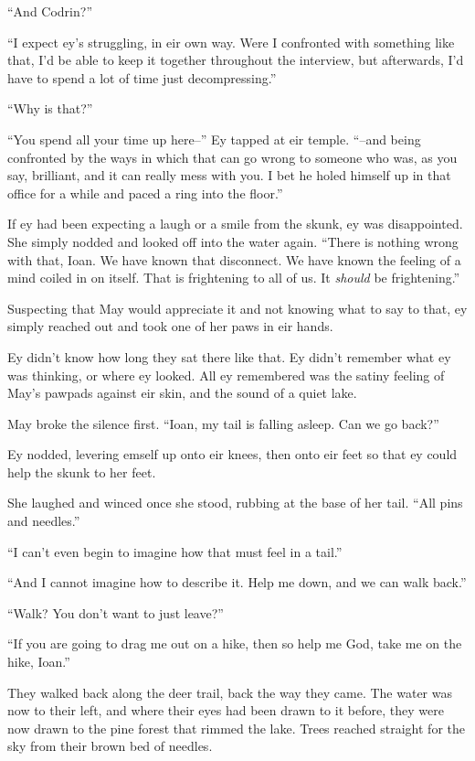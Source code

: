 ``And Codrin?''

``I expect ey's struggling, in eir own way. Were I confronted with something like that, I'd be able to keep it together throughout the interview, but afterwards, I'd have to spend a lot of time just decompressing.''

``Why is that?''

``You spend all your time up here--'' Ey tapped at eir temple. ``--and being confronted by the ways in which that can go wrong to someone who was, as you say, brilliant, and it can really mess with you. I bet he holed himself up in that office for a while and paced a ring into the floor.''

If ey had been expecting a laugh or a smile from the skunk, ey was disappointed. She simply nodded and looked off into the water again. ``There is nothing wrong with that, Ioan. We have known that disconnect. We have known the feeling of a mind coiled in on itself. That is frightening to all of us. It \emph{should} be frightening.''

Suspecting that May would appreciate it and not knowing what to say to that, ey simply reached out and took one of her paws in eir hands.

Ey didn't know how long they sat there like that. Ey didn't remember what ey was thinking, or where ey looked. All ey remembered was the satiny feeling of May's pawpads against eir skin, and the sound of a quiet lake.

May broke the silence first. ``Ioan, my tail is falling asleep. Can we go back?''

Ey nodded, levering emself up onto eir knees, then onto eir feet so that ey could help the skunk to her feet.

She laughed and winced once she stood, rubbing at the base of her tail. ``All pins and needles.''

``I can't even begin to imagine how that must feel in a tail.''

``And I cannot imagine how to describe it. Help me down, and we can walk back.''

``Walk? You don't want to just leave?''

``If you are going to drag me out on a hike, then so help me God, take me on the hike, Ioan.''

They walked back along the deer trail, back the way they came. The water was now to their left, and where their eyes had been drawn to it before, they were now drawn to the pine forest that rimmed the lake. Trees reached straight for the sky from their brown bed of needles.


